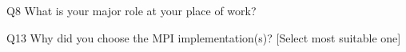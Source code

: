 \begin{description}%
\item{Q8} What is your major role at your place of work?%
\item{Q13} Why did you choose the MPI implementation(s)? [Select most suitable one]%
\end{description}%
